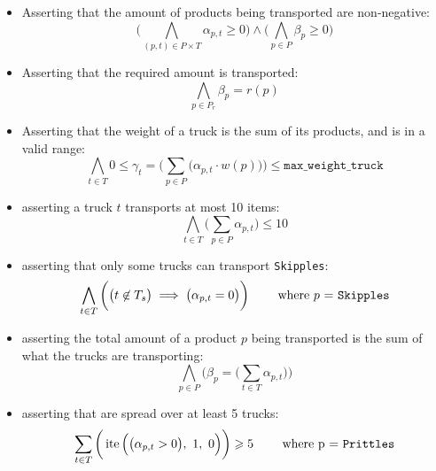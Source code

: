             \begin{itemize}
                \item 
                    Asserting that the amount of products being transported are
                    non-negative:
                    \[
                        \bigg(
                            \bigwedge_{(p, t) \in P \times T} 
                                \alpha_{p,t} \ge 0
                        \bigg) \wedge \bigg(
                            \bigwedge_{p \in P} \beta_p \ge 0
                        \bigg)
                    \]
                \item
                    Asserting that the required amount is transported:
                    \[
                        \bigwedge_{p \in P_r} \beta_{p} = r(p)
                    \]
                \item
                    Asserting that the weight of a truck is the sum of its
                    products, and is in a valid range:
                    \[
                        \bigwedge_{t \in T} 0 \leq \gamma_{t} = \bigg(
                            \sum_{p \in P} \Big(
                                \alpha_{p,t}\cdot w(p)
                            \Big)
                        \bigg) \leq \texttt{max\_weight\_truck}
                    \]
                \item
                    asserting a truck $t$ transports at most 10 items:
                    \[
                        \bigwedge_{t \in T} \bigg(
                            \sum_{p \in P} \alpha_{p,t}
                        \bigg) \leq 10
                    \]
                \item
                    asserting that only some trucks can transport
                    \texttt{Skipples}:
                    \[
                        \bigwedge_{t \in T} \bigg(
                            \big(
                                t \not\in T_s 
                            \big) \implies \big(
                                \alpha_{p,t} = 0
                            \big)
                        \bigg) \qquad \text{ where $p$ = \texttt{Skipples}}
                    \]
                \item
                    asserting the total amount of a product $p$ being
                    transported is the sum of what the trucks are transporting:
                    \[
                        \bigwedge_{p \in P} \bigg(
                            \beta_p = \Big( \sum_{t \in T} \alpha_{p,t}
                            \Big)
                        \bigg)
                    \]
                \item 
                    asserting that \Prittles\text{ } are spread over at least
                    5 trucks:
                    \[
                        \sum_{t \in T} \bigg(
                            \operatorname{ite}\Big(
                                \big(\alpha_{p,t} > 0\big),\ 1,\ 0
                            \Big)
                        \bigg) \geqslant 5 \qquad \text{ where p = \texttt{Prittles}}
                    \]
            \end{itemize}

